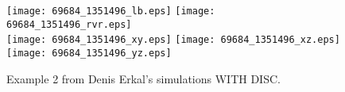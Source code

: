 \documentclass[useAMS,usenatbib]{mn2e}
\begin{document}
\begin{figure*}
\hspace{-1.5cm}
\texttt{[image: 69684\_1351496\_lb.eps]}
\texttt{[image: 69684\_1351496\_rvr.eps]} \\
\vspace{-0.5cm}
\hspace{-1.0cm}
\texttt{[image: 69684\_1351496\_xy.eps]}
\texttt{[image: 69684\_1351496\_xz.eps]}
\texttt{[image: 69684\_1351496\_yz.eps]}
\caption{Example 2 from Denis Erkal's simulations WITH DISC.}
\end{figure*}
\end{document}
